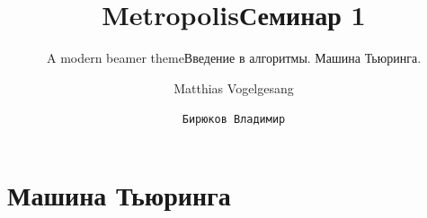 \documentclass[10pt]{beamer}
\title{Metropolis}
\subtitle{A modern beamer theme}
\date{}
\author{Matthias Vogelgesang}
\institute{Center for modern beamer themes}
\title{Семинар 1}
\subtitle{Введение в алгоритмы. Машина Тьюринга.}
\author{\texttt{Бирюков Владимир}}
\institute{МФТИ}
\begin{document}
%
%

\maketitle


%
%

\section{Машина Тьюринга}

\end{document}
